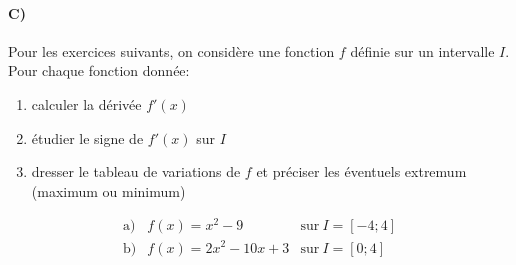\documentclass[a4paper]{article}
\begin{document}
  \paragraph{C)}
  Pour les exercices suivants, on considère une fonction $f$ définie sur un intervalle $I$. Pour chaque fonction donnée:
  \begin{enumerate}
    \item calculer la dérivée $f'(x)$
    \item étudier le signe de $f'(x)$ sur $I$
    \item dresser le tableau de variations de $f$ et préciser les éventuels extremum (maximum ou minimum)
  \end{enumerate}
  \[
    \begin{array}{llll}
      \mathrm{a)} & f(x) = x^2 - 9 & \mathrm{sur}\ I = [-4; 4]\\
      \mathrm{b)} & f(x) = 2x^2 - 10x + 3 & \mathrm{sur}\ I = [0; 4]
    \end{array}
  \]
\end{document}
